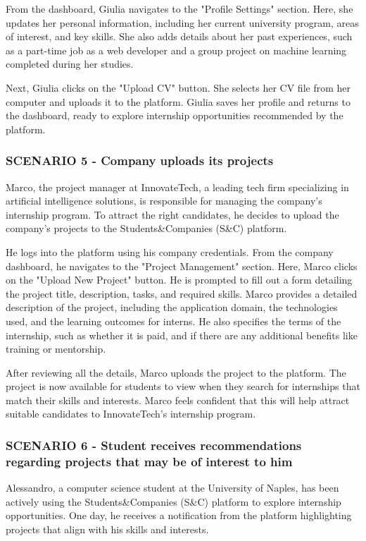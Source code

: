 From the dashboard, Giulia navigates to the "Profile Settings" section. Here, she updates
her personal information, including her current university program, areas of interest, and key
skills. She also adds details about her past experiences, such as a part-time job as a web developer
and a group project on machine learning completed during her studies.  

Next, Giulia clicks on the "Upload CV" button. She selects her CV file from her computer
and uploads it to the platform. Giulia saves her profile and returns to the dashboard, ready to
explore internship opportunities recommended by the platform.
\subsubsection{SCENARIO 5 - Company uploads its projects}
Marco, the project manager at InnovateTech, a leading tech firm specializing in artificial intelligence
solutions, is responsible for managing the company’s internship program. To attract the right candidates,
he decides to upload the company’s projects to the Students\&Companies (S\&C) platform.  

He logs into the platform using his company credentials. From the company dashboard, he navigates to
the "Project Management" section. Here, Marco clicks on the "Upload New Project" button. He is prompted
to fill out a form detailing the project title, description, tasks, and required skills. Marco provides
a detailed description of the project, including the application domain, the technologies used, and the
learning outcomes for interns. He also specifies the terms of the internship, such as whether it is paid,
and if there are any additional benefits like training or mentorship.  

After reviewing all the details, Marco uploads the project to the platform. The project is now available
for students to view when they search for internships that match their skills and interests. Marco feels
confident that this will help attract suitable candidates to InnovateTech’s internship program.
\subsubsection{SCENARIO 6 - Student receives recommendations regarding projects that may be of interest to him}
Alessandro, a computer science student at the University of Naples, has been actively using the
Students\&Companies (S\&C) platform to explore internship opportunities. One day, he receives a
notification from the platform highlighting projects that align with his skills and interests.

